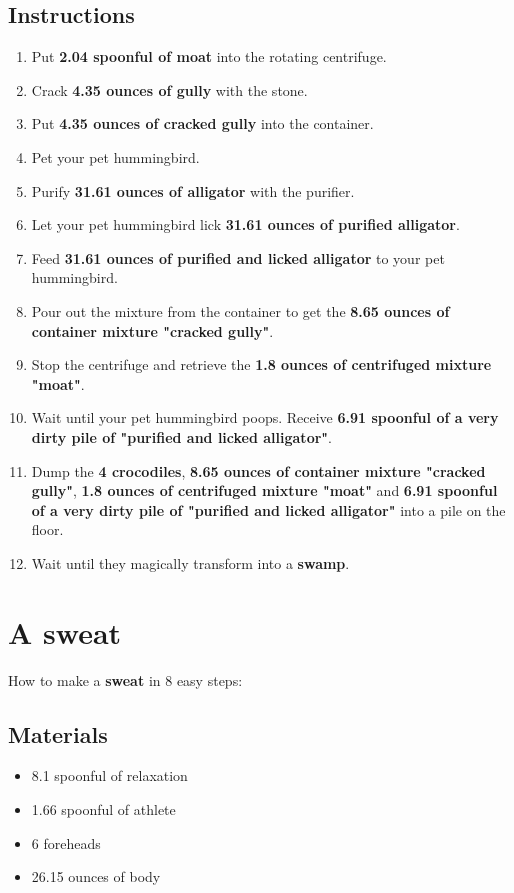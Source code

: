 \documentclass{article}
\begin{document}
\subsection{Instructions}\begin{enumerate}
\item 
Put \textbf{2.04 spoonful of moat} into the rotating centrifuge.
\item 
Crack \textbf{4.35 ounces of gully} with the stone.
\item 
Put \textbf{4.35 ounces of cracked gully} into the container.
\item 
Pet your pet hummingbird.
\item 
Purify \textbf{31.61 ounces of alligator} with the purifier.
\item 
Let your pet hummingbird lick \textbf{31.61 ounces of purified alligator}.
\item 
Feed \textbf{31.61 ounces of purified and licked alligator} to your pet hummingbird.
\item 
Pour out the mixture from the container to get the \textbf{8.65 ounces of container mixture "cracked gully"}.
\item 
Stop the centrifuge and retrieve the \textbf{1.8 ounces of centrifuged mixture "moat"}.
\item 
Wait until your pet hummingbird poops. Receive \textbf{6.91 spoonful of a very dirty pile of "purified and licked alligator"}.
\item 
Dump the \textbf{4 crocodiles}, \textbf{8.65 ounces of container mixture "cracked gully"}, \textbf{1.8 ounces of centrifuged mixture "moat"} and \textbf{6.91 spoonful of a very dirty pile of "purified and licked alligator"} into a pile on the floor.
\item 
Wait until they magically transform into a \textbf{swamp}.
\end{enumerate}
\newpage
\section{A sweat}How to make a \textbf{sweat} in 8 easy steps:

\subsection{Materials}\begin{itemize}
\item 
8.1 spoonful of relaxation
\item 
1.66 spoonful of athlete
\item 
6 foreheads
\item 
26.15 ounces of body
\end{itemize}
\end{document}
